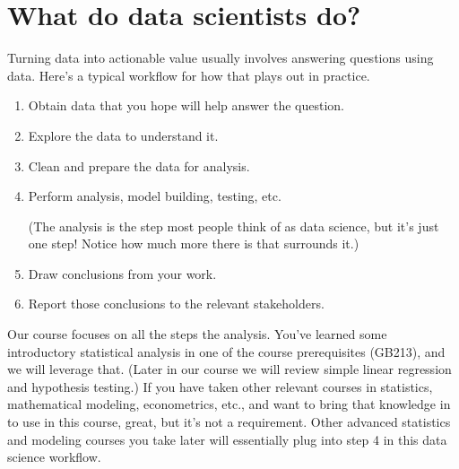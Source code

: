 \documentclass[letterpaper,10pt,english]{jupyterBook}
\begin{document}
\section{What do data scientists do?}
\label{\detokenize{chapter-1-intro-to-data-science:what-do-data-scientists-do}}
\sphinxAtStartPar
Turning data into actionable value usually involves answering questions using data.  Here’s a typical workflow for how that plays out in practice.
\begin{enumerate}
%
\item {} 
\sphinxAtStartPar
Obtain data that you hope will help answer the question.

\item {} 
\sphinxAtStartPar
Explore the data to understand it.

\item {} 
\sphinxAtStartPar
Clean and prepare the data for analysis.

\item {} 
\sphinxAtStartPar
Perform analysis, model building, testing, etc.

\sphinxAtStartPar
(The analysis is the step most people think of as data science, but it’s just one step!  Notice how much more there is that surrounds it.)

\item {} 
\sphinxAtStartPar
Draw conclusions from your work.

\item {} 
\sphinxAtStartPar
Report those conclusions to the relevant stakeholders.

\end{enumerate}

\sphinxAtStartPar
Our course focuses on all the steps  the analysis.  You’ve learned some introductory statistical analysis in one of the course prerequisites (GB213), and we will leverage that.  (Later in our course we will review simple linear regression and hypothesis testing.)  If you have taken other relevant courses in statistics, mathematical modeling, econometrics, etc., and want to bring that knowledge in to use in this course, great, but it’s not a requirement.  Other advanced statistics and modeling courses you take later will essentially plug into step 4 in this data science workflow.
\end{document}
